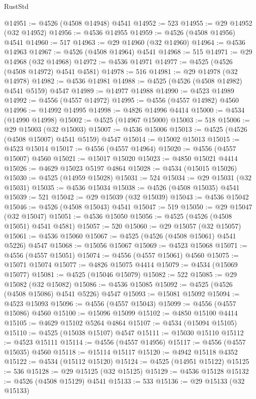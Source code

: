 \begin{lexlean}{RustStd}
\begin{coremodule}
@14951 := @4526 (@4508 @14948) @4541
@14952 := 523
@14955 := @29 @14952 (@32 @14952)
@14956 := @4536 @14955
@14959 := @4526 (@4508 @14956) @4541
@14960 := 517
@14963 := @29 @14960 (@32 @14960)
@14964 := @4536 @14963
@14967 := @4526 (@4508 @14964) @4541
@14968 := 515
@14971 := @29 @14968 (@32 @14968)
@14972 := @4536 @14971
@14977 := @4525 (@4526 (@4508 @14972) @4541 @4581)
@14978 := 516
@14981 := @29 @14978 (@32 @14978)
@14982 := @4536 @14981
@14988 := @4525 (@4526 (@4508 @14982) @4541 @5159) @4547
@14989 := @14977 @14988
@14990 := @4523 @14989
@14992 := @4556 (@4557 @14972)
@14995 := @4556 (@4557 @14982) @4560
@14996 := @14992 @14995
@14998 := @4826 @14996 @4414
@15000 := @4534 (@14990 @14998)
@15002 := @4525 (@14967 @15000)
@15003 := 518
@15006 := @29 @15003 (@32 @15003)
@15007 := @4536 @15006
@15013 := @4525 (@4526 (@4508 @15007) @4541 @5159) @4547
@15014 := @15002 @15013
@15015 := @4523 @15014
@15017 := @4556 (@4557 @14964)
@15020 := @4556 (@4557 @15007) @4560
@15021 := @15017 @15020
@15023 := @4850 @15021 @4414
@15026 := @4629 @15023 @5197 @4864
@15028 := @4534 (@15015 @15026)
@15030 := @4525 (@14959 @15028)
@15031 := 524
@15034 := @29 @15031 (@32 @15031)
@15035 := @4536 @15034
@15038 := @4526 (@4508 @15035) @4541
@15039 := 521
@15042 := @29 @15039 (@32 @15039)
@15043 := @4536 @15042
@15046 := @4526 (@4508 @15043) @4541
@15047 := 519
@15050 := @29 @15047 (@32 @15047)
@15051 := @4536 @15050
@15056 := @4525 (@4526 (@4508 @15051) @4541 @4581)
@15057 := 520
@15060 := @29 @15057 (@32 @15057)
@15061 := @4536 @15060
@15067 := @4525 (@4526 (@4508 @15061) @4541 @5226) @4547
@15068 := @15056 @15067
@15069 := @4523 @15068
@15071 := @4556 (@4557 @15051)
@15074 := @4556 (@4557 @15061) @4560
@15075 := @15071 @15074
@15077 := @4826 @15075 @4414
@15079 := @4534 (@15069 @15077)
@15081 := @4525 (@15046 @15079)
@15082 := 522
@15085 := @29 @15082 (@32 @15082)
@15086 := @4536 @15085
@15092 := @4525 (@4526 (@4508 @15086) @4541 @5226) @4547
@15093 := @15081 @15092
@15094 := @4523 @15093
@15096 := @4556 (@4557 @15043)
@15099 := @4556 (@4557 @15086) @4560
@15100 := @15096 @15099
@15102 := @4850 @15100 @4414
@15105 := @4629 @15102 @5264 @4864
@15107 := @4534 (@15094 @15105)
@15110 := @4525 (@15038 @15107) @4547
@15111 := @15030 @15110
@15112 := @4523 @15111
@15114 := @4556 (@4557 @14956)
@15117 := @4556 (@4557 @15035) @4560
@15118 := @15114 @15117
@15120 := @4942 @15118 @4352
@15122 := @4534 (@15112 @15120)
@15124 := @4525 (@14951 @15122)
@15125 := 536
@15128 := @29 @15125 (@32 @15125)
@15129 := @4536 @15128
@15132 := @4526 (@4508 @15129) @4541
@15133 := 533
@15136 := @29 @15133 (@32 @15133)

\end{coremodule}
\end{lexlean}

